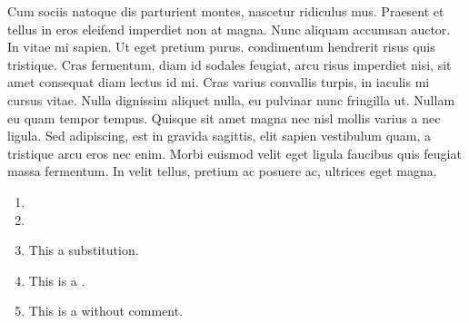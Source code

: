 Cum sociis natoque
 dis
parturient montes, nascetur ridiculus mus. Praesent et tellus in eros
eleifend imperdiet
non at magna. Nunc aliquam accumsan auctor. In vitae mi sapien. Ut eget
pretium purus.
 condimentum
hendrerit risus quis tristique. Cras fermentum, diam id sodales feugiat,
arcu risus imperdiet nisi, sit amet consequat diam lectus id mi. Cras
varius convallis turpis, in iaculis mi cursus vitae. Nulla dignissim
aliquet nulla, eu pulvinar nunc fringilla ut. Nullam
 eu quam tempor tempus.
Quisque sit amet magna nec nisl mollis varius a nec ligula. Sed
adipiscing, est in gravida sagittis, elit sapien vestibulum quam, a
tristique arcu eros nec enim. Morbi euismod velit
eget ligula faucibus quis feugiat massa fermentum. In velit tellus,
pretium ac posuere ac, ultrices eget magna.

\begin{enumerate}
\def\labelenumi{\arabic{enumi}.}
\item
\item
\item
  This  a substitution.
\item
  This is a
  .
\item
  This is a  without comment.
\end{enumerate}
